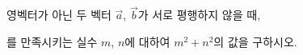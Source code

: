 영벡터가 아닌 두 벡터 $\vec{a}$, $\vec{b}$가 서로 평행하지 않을 때, \par\smallskip{}\par\smallskip\noindent 를 만족시키는 실수 $m$, $n$에 대하여 $m^2+n^2$의 값을 구하시오.
